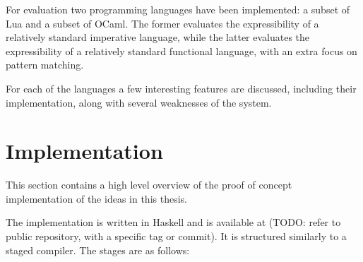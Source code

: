 \documentclass{kththesis}
\begin{document}
For evaluation two programming languages have been implemented: a subset of Lua and a subset of OCaml. The former evaluates the expressibility of a relatively standard imperative language, while the latter evaluates the expressibility of  a relatively standard functional language, with an extra focus on pattern matching.

For each of the languages a few interesting features are discussed, including their implementation, along with several weaknesses of the system.

\section{Implementation} \label{sec:implementation}

This section contains a high level overview of the proof of concept implementation of the ideas in this thesis.

The implementation is written in Haskell and is available at (TODO: refer to public repository, with a specific tag or commit). It is structured similarly to a staged compiler. The stages are as follows:
\end{document}
